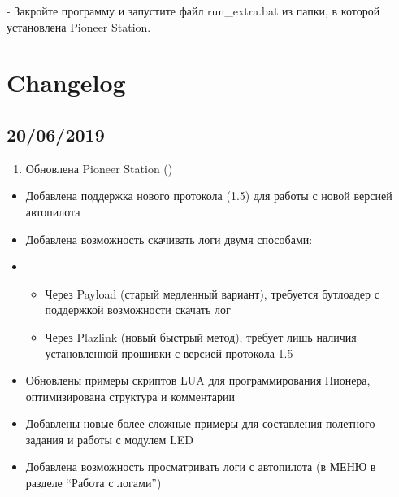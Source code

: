 \documentclass[a4paper,10pt,russian]{sphinxmanual}
\begin{document}
 - Закройте программу и запустите файл run\_extra.bat из папки, в которой установлена Pioneer Station.


\chapter{Changelog}
\label{\detokenize{changelog:changelog}}\label{\detokenize{changelog::doc}}

\section{20/06/2019}
\label{\detokenize{changelog:id1}}\begin{enumerate}
\def\theenumi{\arabic{enumi}}
\def\labelenumi{\theenumi .}
\makeatletter\def\p@enumii{\p@enumi \theenumi .}\makeatother
\item {} 
Обновлена Pioneer Station ()

\end{enumerate}
\begin{itemize}
\item {} 
Добавлена поддержка нового протокола (1.5) для работы с новой версией автопилота

\item {} 
Добавлена возможность скачивать логи двумя способами:

\item {} \begin{itemize}
\item {} 
Через Payload (старый медленный вариант), требуется бутлоадер с поддержкой возможности скачать лог

\item {} 
Через Plazlink (новый быстрый метод), требует лишь наличия установленной прошивки с версией протокола 1.5

\end{itemize}

\item {} 
Обновлены примеры скриптов LUA для программирования Пионера, оптимизирована структура и комментарии

\item {} 
Добавлены новые более сложные примеры для составления полетного задания и работы с модулем LED

\item {} 
Добавлена возможность просматривать логи с автопилота (в МЕНЮ в разделе “Работа с логами”)

\end{itemize}
\end{document}
